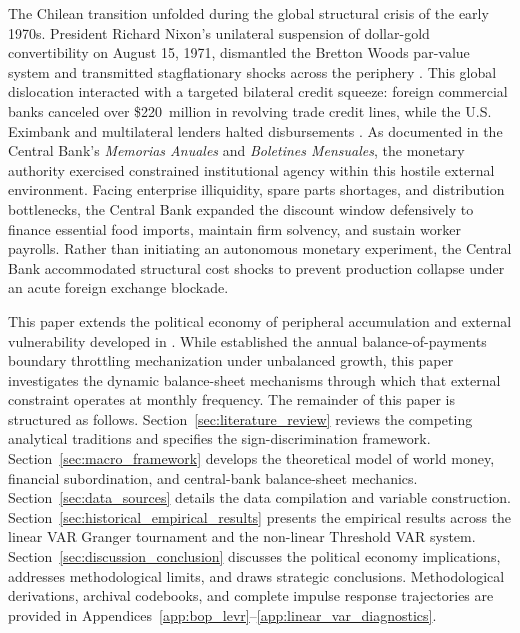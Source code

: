 The Chilean transition unfolded during the global structural crisis of the early 1970s. President Richard Nixon's unilateral suspension of dollar-gold convertibility on August 15, 1971, dismantled the Bretton Woods par-value system and transmitted stagflationary shocks across the periphery \citep{Vernengo2021,Zoeller2019}. This global dislocation interacted with a targeted bilateral credit squeeze: foreign commercial banks canceled over \$220~million in revolving trade credit lines, while the U.S. Eximbank and multilateral lenders halted disbursements \citep{DeVylder1976,PetrasMorley1975}. As documented in the Central Bank's \textit{Memorias Anuales} and \textit{Boletines Mensuales}, the monetary authority exercised constrained institutional agency within this hostile external environment. Facing enterprise illiquidity, spare parts shortages, and distribution bottlenecks, the Central Bank expanded the discount window defensively to finance essential food imports, maintain firm solvency, and sustain worker payrolls. Rather than initiating an autonomous monetary experiment, the Central Bank accommodated structural cost shocks to prevent production collapse under an acute foreign exchange blockade.

This paper extends the political economy of peripheral accumulation and external vulnerability developed in \citet{Polanco2026}. While \citet{Polanco2026} established the annual balance-of-payments boundary throttling mechanization under unbalanced growth, this paper investigates the dynamic balance-sheet mechanisms through which that external constraint operates at monthly frequency. The remainder of this paper is structured as follows. Section~\ref{sec:literature_review} reviews the competing analytical traditions and specifies the sign-discrimination framework. Section~\ref{sec:macro_framework} develops the theoretical model of world money, financial subordination, and central-bank balance-sheet mechanics. Section~\ref{sec:data_sources} details the data compilation and variable construction. Section~\ref{sec:historical_empirical_results} presents the empirical results across the linear VAR Granger tournament and the non-linear Threshold VAR system. Section~\ref{sec:discussion_conclusion} discusses the political economy implications, addresses methodological limits, and draws strategic conclusions. Methodological derivations, archival codebooks, and complete impulse response trajectories are provided in Appendices~\ref{app:bop_levr}--\ref{app:linear_var_diagnostics}.
